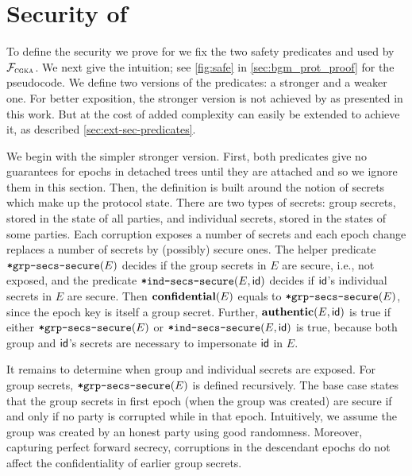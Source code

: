 
\section{Security of \saik}\label{sec:saik-sec-int}
To define the security we prove for \saik we fix the two safety
predicates \KwConf{} and \KwAuth{} used by $\mathcal{F}_{\normalfont\textsc{cgka}}$. We next give the intuition; see \cref{fig:safe} in \cref{sec:bgm_prot_proof} for the pseudocode. We define two versions of the
predicates: a stronger and a weaker one. For better exposition, the
stronger version is not achieved by \saik as presented in this work. But at the cost of added complexity
\saik can easily be extended to achieve it, as
described \cref{sec:ext-sec-predicates}.

We begin with the simpler stronger version. First, both predicates give no
guarantees for epochs in detached trees until they are attached and so we
ignore them in this section. Then, the definition is built around the notion of
secrets which make up the protocol state. There are two types of secrets:
group secrets, stored in the state of all parties, and individual secrets,
stored in the states of some parties. Each corruption exposes a number of
secrets and each epoch change replaces a number of secrets by (possibly)
secure ones. The helper predicate ${\textnormal{\tt*grp-secs-secure}}{}(E)$ decides
if the group secrets in $E$ are secure, i.e., not exposed, and the
predicate ${\textnormal{\tt*ind-secs-secure}}(E, {\mathsf{id}})$ decides if ${\mathsf{id}}$'s individual
secrets in $E$ are secure.
%
Then $\textnormal{\textbf{confidential}}{}(E)$ equals to
${\textnormal{\tt*grp-secs-secure}}{}(E)$, since the epoch key is itself a group
secret. Further, $\textnormal{\textbf{authentic}}{}(E, {\mathsf{id}})$ is true if either
${\textnormal{\tt*grp-secs-secure}}{}(E)$ or
${\textnormal{\tt*ind-secs-secure}}(E,{\mathsf{id}})$ is true, because both group and ${\mathsf{id}}$'s secrets
are necessary to impersonate ${\mathsf{id}}$ in $E$.

It remains to determine when group and individual secrets are exposed. For
group secrets, ${\textnormal{\tt*grp-secs-secure}}(E)$ is defined recursively. The
base case states that the group secrets in first epoch (when the group was
created) are secure if and only if no party is corrupted while in that epoch.
Intuitively, we assume the group was created by an honest party using good
randomness. Moreover, capturing perfect forward secrecy, corruptions in the
descendant epochs do not affect the confidentiality of earlier group secrets.

